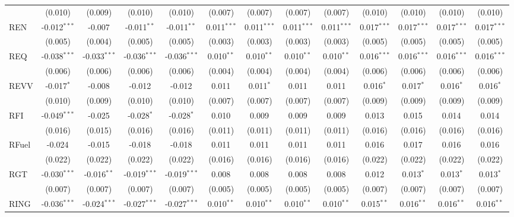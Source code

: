 \begin{table}[!htbp]
\begin{tabular}{@{\extracolsep{5pt}}lcccccccccccc}
  & (0.010) & (0.009) & (0.010) & (0.010) & (0.007) & (0.007) & (0.007) & (0.007) & (0.010) & (0.010) & (0.010) & (0.010) \\
 REN & -0.012$^{***}$ & -0.007$^{}$ & -0.011$^{**}$ & -0.011$^{**}$ & 0.011$^{***}$ & 0.011$^{***}$ & 0.011$^{***}$ & 0.011$^{***}$ & 0.017$^{***}$ & 0.017$^{***}$ & 0.017$^{***}$ & 0.017$^{***}$ \\
  & (0.005) & (0.004) & (0.005) & (0.005) & (0.003) & (0.003) & (0.003) & (0.003) & (0.005) & (0.005) & (0.005) & (0.005) \\
 REQ & -0.038$^{***}$ & -0.033$^{***}$ & -0.036$^{***}$ & -0.036$^{***}$ & 0.010$^{**}$ & 0.010$^{**}$ & 0.010$^{**}$ & 0.010$^{**}$ & 0.016$^{***}$ & 0.016$^{***}$ & 0.016$^{***}$ & 0.016$^{***}$ \\
  & (0.006) & (0.006) & (0.006) & (0.006) & (0.004) & (0.004) & (0.004) & (0.004) & (0.006) & (0.006) & (0.006) & (0.006) \\
 REVV & -0.017$^{*}$ & -0.008$^{}$ & -0.012$^{}$ & -0.012$^{}$ & 0.011$^{}$ & 0.011$^{*}$ & 0.011$^{}$ & 0.011$^{}$ & 0.016$^{*}$ & 0.017$^{*}$ & 0.016$^{*}$ & 0.016$^{*}$ \\
  & (0.010) & (0.009) & (0.010) & (0.010) & (0.007) & (0.007) & (0.007) & (0.007) & (0.009) & (0.009) & (0.009) & (0.009) \\
 RFI & -0.049$^{***}$ & -0.025$^{}$ & -0.028$^{*}$ & -0.028$^{*}$ & 0.010$^{}$ & 0.009$^{}$ & 0.009$^{}$ & 0.009$^{}$ & 0.013$^{}$ & 0.015$^{}$ & 0.014$^{}$ & 0.014$^{}$ \\
  & (0.016) & (0.015) & (0.016) & (0.016) & (0.011) & (0.011) & (0.011) & (0.011) & (0.016) & (0.016) & (0.016) & (0.016) \\
 RFuel & -0.024$^{}$ & -0.015$^{}$ & -0.018$^{}$ & -0.018$^{}$ & 0.011$^{}$ & 0.011$^{}$ & 0.011$^{}$ & 0.011$^{}$ & 0.016$^{}$ & 0.017$^{}$ & 0.016$^{}$ & 0.016$^{}$ \\
  & (0.022) & (0.022) & (0.022) & (0.022) & (0.016) & (0.016) & (0.016) & (0.016) & (0.022) & (0.022) & (0.022) & (0.022) \\
 RGT & -0.030$^{***}$ & -0.016$^{**}$ & -0.019$^{***}$ & -0.019$^{***}$ & 0.008$^{}$ & 0.008$^{}$ & 0.008$^{}$ & 0.008$^{}$ & 0.012$^{}$ & 0.013$^{*}$ & 0.013$^{*}$ & 0.013$^{*}$ \\
  & (0.007) & (0.007) & (0.007) & (0.007) & (0.005) & (0.005) & (0.005) & (0.005) & (0.007) & (0.007) & (0.007) & (0.007) \\
 RING & -0.036$^{***}$ & -0.024$^{***}$ & -0.027$^{***}$ & -0.027$^{***}$ & 0.010$^{**}$ & 0.010$^{**}$ & 0.010$^{**}$ & 0.010$^{**}$ & 0.015$^{**}$ & 0.016$^{**}$ & 0.016$^{**}$ & 0.016$^{**}$ \\

\end{tabular}
\end{table}
